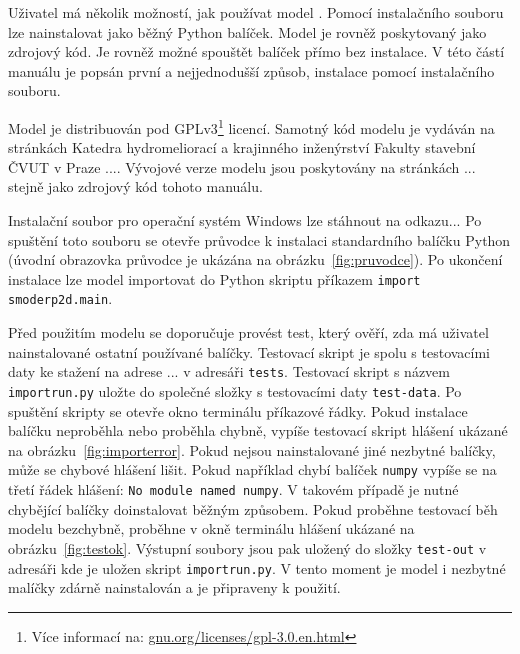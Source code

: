   
  Uživatel má několik možností, jak používat model \smod. Pomocí instalačního souboru lze nainstalovat \smod jako běžný Python balíček. Model \smod je rovněž poskytovaný jako zdrojový kód. Je rovněž možné spouštět balíček přímo bez instalace. V této částí manuálu je popsán první a nejjednodušší způsob, instalace pomocí instalačního souboru. 
  
  Model \smod je distribuován pod GPLv3\footnote{Více informací na: \href{https://www.gnu.org/licenses/gpl-3.0.en.html}{gnu.org/licenses/gpl-3.0.en.html}} licencí. Samotný kód modelu \smod je vydáván na stránkách  Katedra  hydromeliorací a krajinného inženýrství Fakulty stavební ČVUT v Praze .... Vývojové verze modelu jsou poskytovány na stránkách ... stejně jako zdrojový kód tohoto manuálu. 
  
  Instalační soubor pro operační systém Windows lze stáhnout na odkazu... Po spuštění toto souboru se otevře průvodce k instalaci standardního balíčku Python (úvodní obrazovka průvodce je ukázána na obrázku~\ref{fig:pruvodce}). Po ukončení instalace lze model \smod importovat do Python skriptu příkazem {\tt import smoderp2d.main}. 

  Před použitím modelu se doporučuje provést test, který ověří, zda má uživatel nainstalované ostatní používané balíčky. Testovací skript je spolu s testovacími daty ke stažení na adrese ... v adresáři {\tt tests}. Testovací skript s názvem {\tt importrun.py} uložte do společné složky s testovacími daty {\tt test-data}. Po spuštění skripty se otevře okno terminálu příkazové řádky. Pokud instalace balíčku \smod neproběhla nebo proběhla chybně, vypíše testovací skript hlášení ukázané na obrázku~\ref{fig:importerror}. Pokud nejsou nainstalované jiné nezbytné balíčky, může se chybové hlášení lišit. Pokud například chybí balíček {\tt numpy} vypíše se na třetí řádek hlášení: {\tt No module named numpy}. V takovém případě je nutné chybějící balíčky doinstalovat běžným způsobem. Pokud proběhne testovací běh modelu \smod bezchybně, proběhne v okně terminálu hlášení ukázané na obrázku~\ref{fig:testok}. Výstupní soubory jsou pak uložený do složky {\tt test-out} v adresáři kde je uložen skript {\tt importrun.py}. V tento moment je model \smod i nezbytné malíčky zdárně nainstalován a je připraveny k použití.
  
